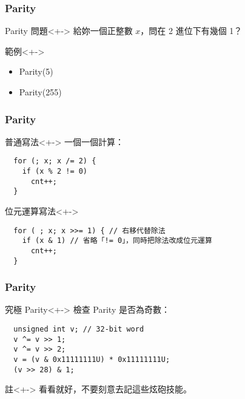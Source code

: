 \documentclass[utf8]{beamer}
\begin{document}
\begin{CJK}{UTF8}{bkai}
\begin{frame}[fragile]
  \frametitle{Parity}
  \begin{block}{Parity 問題}<+->
  給妳一個正整數 $x$，問在 2 進位下有幾個 1？
  \end{block}
  \begin{exampleblock}{範例}<+->
    \begin{itemize}
    \item Parity(5) 
    \item<+-> Parity(255) 
    \end{itemize}
  \end{exampleblock}
\end{frame}

\begin{frame}[fragile]
  \frametitle{Parity}
  \begin{block}{普通寫法}<+->
  一個一個計算：
    \begin{lstlisting}
  for (; x; x /= 2) {
    if (x % 2 != 0)
      cnt++;
  }
    \end{lstlisting}
  \end{block}
  \begin{exampleblock}{位元運算寫法}<+->
    \begin{lstlisting}
  for ( ; x; x >>= 1) { // 右移代替除法
    if (x & 1) // 省略「!= 0」，同時把除法改成位元運算
      cnt++;
  }
    \end{lstlisting}
  \end{exampleblock}
\end{frame}

\begin{frame}[fragile]
  \frametitle{Parity}
  \begin{exampleblock}{究極 Parity}<+->
  檢查 Parity 是否為奇數：
    \begin{lstlisting}
  unsigned int v; // 32-bit word
  v ^= v >> 1;
  v ^= v >> 2;
  v = (v & 0x11111111U) * 0x11111111U;
  (v >> 28) & 1;
    \end{lstlisting}
  \end{exampleblock}
  \begin{alertblock}{註}<+->
  看看就好，不要刻意去記這些炫砲技能。
  \end{alertblock}
\end{frame}


\end{CJK}
\end{document}
